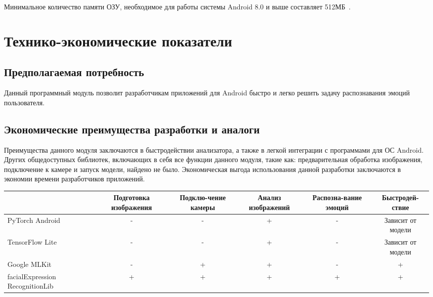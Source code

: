\documentclass[a4paper,12pt]{article}
\begin{document}
    Минимальное количество памяти ОЗУ, необходимое для работы системы Android 8.0 и выше составляет 512МБ~\cite{AndroidReq}.

    \newpage
    \section{Технико-экономические показатели}

    \subsection{Предполагаемая потребность}
    Данный программный модуль позволит разработчикам приложений для Android быстро и легко решить задачу распознавания эмоций пользователя.

    \subsection{Экономические преимущества разработки и аналоги}
    Преимущества данного модуля заключаются в быстродействии анализатора, а также в легкой интеграции с программами для ОС Android.
    Других общедоступных библиотек, включающих в себя все функции данного модуля, такие как: предварительная обработка изображения, подключение к камере и запуск модели, найдено не было.
    Экономическая выгода использования данной разработки заключаются в экономии времени разработчиков приложений.
    \\

    \noindent
    \begin{tabular}{| l | c | c | c | c | c |}
        \hline
        & \parbox[c][2cm][c]{2.2cm}{\centering Подготовка изображения}
        & \parbox[c][2cm][c]{2.2cm}{\centering Подклю-чение камеры}
        & \parbox[c][2cm][c]{2.2cm}{\centering Анализ изображений}
        & \parbox[c][2cm][c]{2.2cm}{\centering Распозна-вание эмоций}
        & \parbox[c][2cm][c]{2.2cm}{\centering Быстродей-ствие} \\
        \hline
        \parbox[c][1.2cm][c]{3cm}{PyTorch Android} & - & - & + & - & \parbox[c][1.2cm][c]{2.2cm}{\centering Зависит от модели} \\
        \hline
        \parbox[c][1.2cm][c]{3cm}{TensorFlow Lite} & - & - & + & - & \parbox[c][1.2cm][c]{2.2cm}{\centering Зависит от модели} \\
        \hline
        \parbox[c][1.2cm][c]{3cm}{Google MLKit} & - & + & + & - & + \\
        \hline
        \parbox[c][1.2cm][c]{3cm}{facialExpression RecognitionLib} & + & + & + & + & + \\
        \hline
    \end{tabular}
\end{document}
